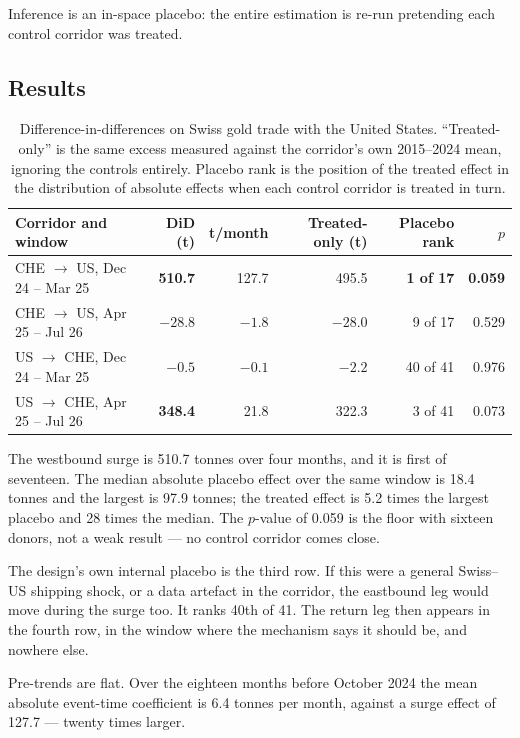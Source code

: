 \documentclass[11pt,a4paper]{article}
\begin{document}
Inference is an in-space placebo: the entire estimation is re-run pretending each control
corridor was treated.

\subsection{Results}

\begin{table}[h]
\centering
\small
\begin{tabular}{@{}lrrrrr@{}}
\toprule
\textbf{Corridor and window} & \textbf{DiD (t)} & \textbf{t/month} & \textbf{Treated-only (t)} & \textbf{Placebo rank} & \textbf{$p$} \\
\midrule
CHE $\to$ US, Dec 24 -- Mar 25 & \textbf{510.7} & 127.7 & 495.5 & \textbf{1 of 17} & \textbf{0.059} \\
CHE $\to$ US, Apr 25 -- Jul 26 & $-28.8$ & $-1.8$ & $-28.0$ & 9 of 17 & 0.529 \\
US $\to$ CHE, Dec 24 -- Mar 25 & $-0.5$ & $-0.1$ & $-2.2$ & 40 of 41 & 0.976 \\
US $\to$ CHE, Apr 25 -- Jul 26 & \textbf{348.4} & 21.8 & 322.3 & 3 of 41 & 0.073 \\
\bottomrule
\end{tabular}
\caption{Difference-in-differences on Swiss gold trade with the United States. ``Treated-only''
is the same excess measured against the corridor's own 2015--2024 mean, ignoring the controls
entirely. Placebo rank is the position of the treated effect in the distribution of absolute
effects when each control corridor is treated in turn.}
\label{tab:did}
\end{table}

The westbound surge is 510.7 tonnes over four months, and it is first of seventeen. The median
absolute placebo effect over the same window is 18.4 tonnes and the largest is 97.9 tonnes; the
treated effect is 5.2 times the largest placebo and 28 times the median. The $p$-value of 0.059
is the floor with sixteen donors, not a weak result --- no control corridor comes close.

The design's own internal placebo is the third row. If this were a general Swiss--US shipping
shock, or a data artefact in the corridor, the eastbound leg would move during the surge too. It
ranks 40th of 41. The return leg then appears in the fourth row, in the window where the
mechanism says it should be, and nowhere else.

Pre-trends are flat. Over the eighteen months before October 2024 the mean absolute event-time
coefficient is 6.4 tonnes per month, against a surge effect of 127.7 --- twenty times larger.
\end{document}
